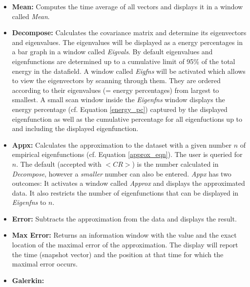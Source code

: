 \begin{description}
\begin{itemize}
\item {\bf Mean:}  
	Computes the time average of all vectors and displays
	it in
	a window called {\sl Mean}.
\item {\bf Decompose:} 
	Calculates the covariance matrix and determine its
	eigenvectors  and eigenvalues.   The eigenvalues will be displayed as a 
	energy percentages in a bar graph in a window called {\sl Eigvals}. By
	default eigenvalues and eigenfunctions are determined up to a cumulative
	limit of 95\% of the total energy in the datafield. A window called {\sl
	Eigfns} will be activated which  allows to view the eigenvectors by 
	scanning through them. They are ordered according to their eigenvalues 
	(= energy percentages) from largest to smallest. A small scan window
	inside the {\sl Eigenfns} 
	window displays  the energy percentage (cf. Equation \ref{energy_pc})
	captured by the
	displayed eigenfunction as well as
	the cumulative percentage for all eigenfuctions
	up to and including the displayed eigenfunction.
\item{\bf Appx:} 
	Calculates the approximation to the dataset with a given number $n$ of
	empirical eigenfunctions (cf. Equation \ref{approx_eqn}). The user is
	queried for $n$. The default (accepted with $<CR>$) is the number
	calculated in {\sl Decompose}, however a {\em smaller} number can also
	be entered. {\sl Appx} has two outcomes: It activates a window called
	{\sl Approx}
	and displays the approximated data. It also restricts the number of
	eigenfunctions that can be displayed in {\sl Eigenfns} to $n$.
\item{\bf Error:}  
	Subtracts the approximation from the data and displays the result.
\item{\bf Max Error:}  
	Returns an information window with the value and the exact location of
	the maximal error of the approximation. The display will report
	the time (snapshot vector) and the position at that time for which the
	maximal error occurs. 

\item{\bf Galerkin:} 
\end{itemize}


\end{description}
